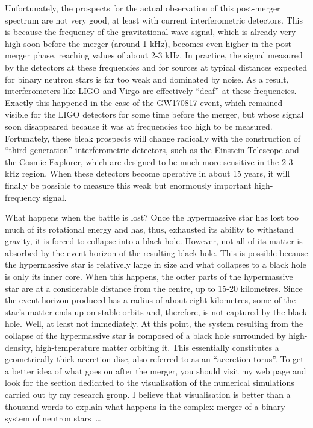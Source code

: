 Unfortunately, the prospects for the actual observation of this post-merger
spectrum are not very good, at least with current interferometric
detectors. This is because the frequency of the gravitational-wave signal, which is
already very high soon before the merger (around 1 kHz), becomes even higher in the
post-merger phase, reaching values of about 2-3 kHz. In practice, the
signal measured by the detectors at these frequencies and for sources at typical
distances expected for binary neutron stars is far too weak and dominated by noise. As a
result, interferometers like LIGO and Virgo are effectively ``deaf'' at these
frequencies. Exactly this happened in the case of the GW170817 event,
which remained visible for the LIGO detectors for some time before the merger, but whose
signal soon disappeared because it was at frequencies too high to be measured.
Fortunately, these bleak prospects will change radically with the construction of
``third-generation'' interferometric detectors, such as the Einstein Telescope and the
Cosmic Explorer, which are designed to be much more sensitive in the
2-3 kHz region. When these detectors become operative in about 15 years, it will finally
be possible to measure this weak but enormously important high-frequency signal.

What happens when the battle is lost? Once the hypermassive star has lost too much of
its rotational energy and has, thus, exhausted its ability to
withstand gravity, it is forced to collapse into a black hole. However, not all of its
matter is absorbed by the event horizon of the resulting black hole. This is possible
because the hypermassive star is relatively large in size and what
collapses to a black hole is only its inner core. When this happens,
the outer parts of the hypermassive star are at a considerable distance from the centre,
up to 15-20 kilometres. Since the event horizon produced has a radius of about eight
kilometres, some of the star's matter ends up on stable orbits and, therefore, is not
captured by the black hole. Well, at least not immediately. At this point, the system
resulting from the collapse of the hypermassive star is composed of a black hole
surrounded by high-density, high-temperature matter orbiting it. This essentially
constitutes a geometrically thick accretion disc, also referred to as an ``accretion
torus''. To get a better idea of what goes on after the merger, you
should visit my web page and look for the section dedicated to the visualisation of the
numerical simulations carried out by my research group. I believe that visualisation is
better than a thousand words to explain what happens in the complex merger of a binary
system of neutron stars~\ldots{}

